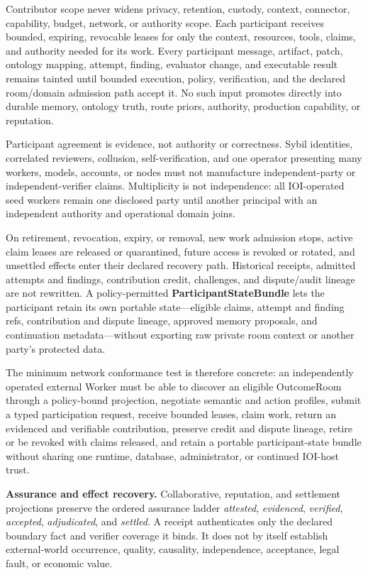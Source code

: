 \documentclass[
  11pt,
]{article}
\begin{document}
Contributor scope never widens privacy, retention, custody, context,
connector, capability, budget, network, or authority scope. Each participant
receives bounded, expiring, revocable leases for only the context, resources,
tools, claims, and authority needed for its work. Every participant message,
artifact, patch, ontology mapping, attempt, finding, evaluator change, and
executable result remains tainted until bounded execution, policy,
verification, and the declared room/domain admission path accept it. No such
input promotes directly into durable memory, ontology truth, route priors,
authority, production capability, or reputation.

Participant agreement is evidence, not authority or correctness. Sybil
identities, correlated reviewers, collusion, self-verification, and one
operator presenting many workers, models, accounts, or nodes must not
manufacture independent-party or independent-verifier claims. Multiplicity is
not independence: all IOI-operated seed workers remain one disclosed party
until another principal with an independent authority and operational domain
joins.

On retirement, revocation, expiry, or removal, new work admission stops,
active claim leases are released or quarantined, future access is revoked or
rotated, and unsettled effects enter their declared recovery path. Historical
receipts, admitted attempts and findings, contribution credit, challenges,
and dispute/audit lineage are not rewritten. A policy-permitted
\textbf{ParticipantStateBundle} lets the participant retain its own portable
state---eligible claims, attempt and finding refs, contribution and dispute
lineage, approved memory proposals, and continuation metadata---without
exporting raw private room context or another party's protected data.

The minimum network conformance test is therefore concrete: an independently
operated external Worker must be able to discover an eligible OutcomeRoom
through a policy-bound projection, negotiate semantic and action profiles,
submit a typed participation request, receive bounded leases, claim work,
return an evidenced and verifiable contribution, preserve credit and dispute
lineage, retire or be revoked with claims released, and retain a portable
participant-state bundle without sharing one runtime, database,
administrator, or continued IOI-host trust.

\textbf{Assurance and effect recovery.} Collaborative, reputation, and
settlement projections preserve the ordered assurance ladder
\emph{attested}, \emph{evidenced}, \emph{verified}, \emph{accepted},
\emph{adjudicated}, and \emph{settled}. A receipt authenticates only the
declared boundary fact and verifier coverage it binds. It does not by itself
establish external-world occurrence, quality, causality, independence,
acceptance, legal fault, or economic value.
\end{document}
